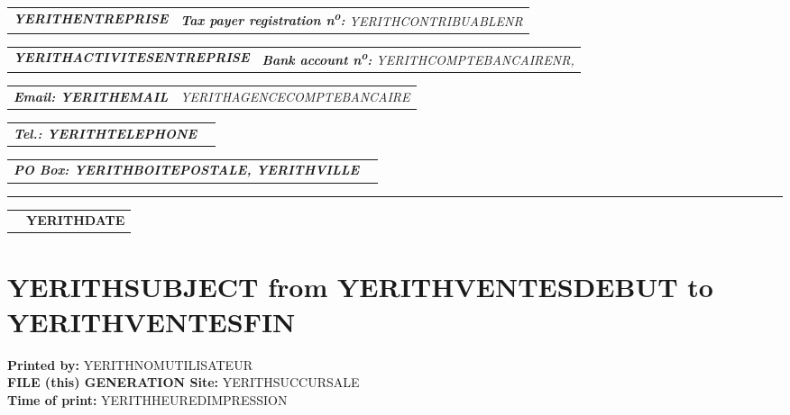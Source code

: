 \documentclass[16pt,YERITHPAPERSPEC]{article} %
\makeatletter
\newcommand{\headerrow}[2]
{\begin{tabular*}{\linewidth}{l@{\extracolsep{\fill}}r}
	#1 &
	#2 \\
\end{tabular*}}
\newcommand{\emphbold}[1]{\textbf{\emph{#1}}\xspace}
\makeatother
\begin{document}
\bigskip

\headerrow
	{\emphbold{YERITHENTREPRISE}}
	{\emph{\textbf{Tax payer registration n\textsuperscript{o}:} YERITHCONTRIBUABLENR}}
\headerrow
	{\emphbold{YERITHACTIVITESENTREPRISE}}
	{\emph{\textbf{Bank account n\textsuperscript{o}:} YERITHCOMPTEBANCAIRENR,}}
\headerrow
	{\emphbold{Email: YERITHEMAIL}}
	{\emph{YERITHAGENCECOMPTEBANCAIRE}}
\headerrow
	{\emphbold{Tel.: YERITHTELEPHONE}}
	{}
\headerrow
	{\emphbold{PO Box: YERITHBOITEPOSTALE, YERITHVILLE}}
	{}
	
\hrule

\headerrow
	{}
	{\textbf{YERITHDATE}}

\section*{YERITHSUBJECT from YERITHVENTESDEBUT to YERITHVENTESFIN}

\textbf{Printed by:} YERITHNOMUTILISATEUR\\
\textbf{FILE (this) GENERATION Site:} YERITHSUCCURSALE\\
\textbf{Time of print:} YERITHHEUREDIMPRESSION

\vspace{0.3cm}
\end{document}
